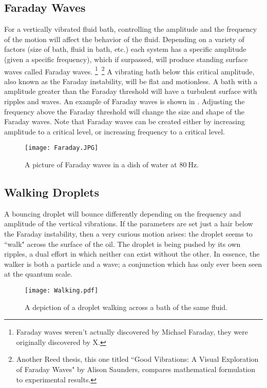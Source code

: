 \subsection{Faraday Waves}
	    For a vertically vibrated fluid bath, controlling the amplitude and the frequency of the motion will affect the behavior of the fluid. Depending on a variety of factors (size of bath, fluid in bath, etc.) each system has a specific amplitude (given a specific frequency), which if surpassed, will produce standing surface waves called Faraday waves. \footnote{Faraday waves weren't actually discovered by Michael Faraday, they were originally discovered by X.}~\footnote{Another Reed thesis, this one titled ``Good Vibrations: A Visual Exploration of Faraday Waves" by Alison Saunders, compares mathematical formulation to experimental results.} A vibrating bath below this critical amplitude, also known as the Faraday instability, will be flat and motionless. A bath with a amplitude greater than the Faraday threshold will have a turbulent surface with ripples and waves. An example of Faraday waves is shown in . Adjusting the frequency above the Faraday threshold will change the size and shape of the Faraday waves. Note that Faraday waves can be created either by increasing amplitude to a critical level, or increasing frequency to a critical level.
	    
	    \begin{figure}[h!]
	\centering
	\texttt{[image: Faraday.JPG]}
	\caption{A picture of Faraday waves in a dish of water at $80~\mathrm{Hz}$.}
	\label{faraday waves}
\end{figure}

\subsection{Walking Droplets}
	    
	A bouncing droplet will bounce differently depending on the frequency and amplitude of the vertical vibrations. If the parameters are set just a hair below the Faraday instability, then a very curious motion arises: the droplet seems to ``walk" across the surface of the oil. The droplet is being pushed by its own ripples, a dual effort in which neither can exist without the other. In essence, the walker is both a particle and a wave; a conjunction which has only ever been seen at the quantum scale. 
	  
\begin{figure}[h!]
	\centering
	\texttt{[image: Walking.pdf]}
	\caption{A depiction of a droplet walking across a bath of the same fluid.}
	\label{bounce}
\end{figure}
	    
